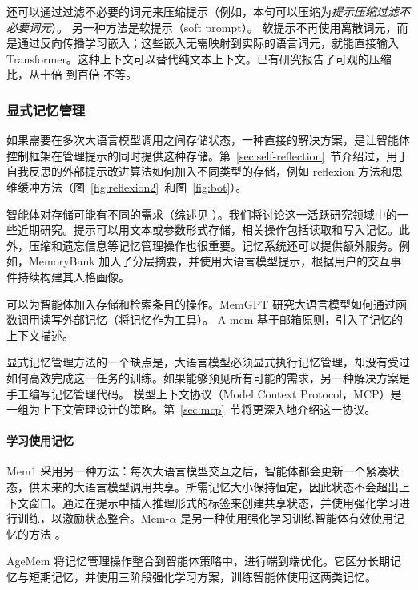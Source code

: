 还可以通过过滤不必要的词元来压缩提示（例如，本句可以压缩为{\em 提示压缩过滤不必要词元}）。
另一种方法是软提示（soft prompt）\citep{lester2021power}。
软提示不再使用离散词元，而是通过反向传播学习嵌入；这些嵌入无需映射到实际的语言词元，就能直接输入 Transformer。这种上下文可以替代纯文本上下文。已有研究报告了可观的压缩比，从十倍 \citep{mu2023learning} 到百倍 \citep{li2025500xcompressor} 不等。




\subsubsection{显式记忆管理}
如果需要在多次大语言模型调用之间存储状态，一种直接的解决方案，是让智能体控制框架在管理提示的同时提供这种存储。第~\ref{sec:self-reflection}~节介绍过，用于自我反思的外部提示改进算法如何加入不同类型的存储，例如 reflexion 方法和思维缓冲方法（图~\ref{fig:reflexion2}~和图~\ref{fig:bot}）。

智能体对存储可能有不同的需求（综述见 \citet{zhang2025survey,chhikara2025mem0}）。我们将讨论这一活跃研究领域中的一些近期研究。提示可以用文本或参数形式存储，相关操作包括读取和写入记忆。此外，压缩和遗忘信息等记忆管理操作也很重要。记忆系统还可以提供额外服务。例如，MemoryBank \citep{zhong2024memorybank} 加入了分层摘要，并使用大语言模型提示，根据用户的交互事件持续构建其人格画像。

可以为智能体加入存储和检索条目的操作。MemGPT \citep{packer2023memgpt} 研究大语言模型如何通过函数调用读写外部记忆（将记忆作为工具）。
A-mem \citep{xu2025mem} 基于邮箱原则，引入了记忆的上下文描述。

显式记忆管理方法的一个缺点是，大语言模型必须显式执行记忆管理，却没有受过如何高效完成这一任务的训练。如果能够预见所有可能的需求，另一种解决方案是手工编写记忆管理代码。
模型上下文协议（Model Context Protocol，MCP）是一组为上下文管理设计的策略。第~\ref{sec:mcp}~节将更深入地介绍这一协议。


\paragraph{学习使用记忆}
Mem1 \citep{zhou2025mem1} 采用另一种方法：每次大语言模型交互之后，智能体都会更新一个紧凑状态，供未来的大语言模型调用共享。所需记忆大小保持恒定，因此状态不会超出上下文窗口。通过在提示中插入推理形式的标签来创建共享状态，并使用强化学习进行训练，以激励状态整合。Mem-$\alpha$ 是另一种使用强化学习训练智能体有效使用记忆的方法 \citep{wang2025mem}。

AgeMem \citep{yu2026agentic} 将记忆管理操作整合到智能体策略中，进行端到端优化。它区分长期记忆与短期记忆，并使用三阶段强化学习方案，训练智能体使用这两类记忆。

